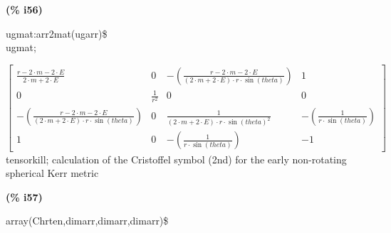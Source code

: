 \documentclass[fleqn]{article}
\begin{document}
\noindent
\begin{minipage}[t]{4.000000em}\color{red}\bfseries
(\% i56)	
\end{minipage}
\begin{minipage}[t]{\textwidth}\color{blue}
ugmat:arr2mat(ugarr)\$\\
ugmat;
\end{minipage}
\[\displaystyle \tag{\% o56} 
\begin{bmatrix}\frac{r\mathop{-}2\mathop{\ensuremath{\cdot}}m\mathop{-}2\mathop{\ensuremath{\cdot}}E}{2\mathop{\ensuremath{\cdot}}m\mathop{+}2\mathop{\ensuremath{\cdot}}E} & 0 & \mathop{-}\left( \frac{r\mathop{-}2\mathop{\ensuremath{\cdot}}m\mathop{-}2\mathop{\ensuremath{\cdot}}E}{\left( 2\mathop{\ensuremath{\cdot}}m\mathop{+}2\mathop{\ensuremath{\cdot}}E\right) \mathop{\ensuremath{\cdot}}r\mathop{\ensuremath{\cdot}}\sin{(theta)}}\right)  & 1\\
0 & \frac{1}{{{r}^{2}}} & 0 & 0\\
\mathop{-}\left( \frac{r\mathop{-}2\mathop{\ensuremath{\cdot}}m\mathop{-}2\mathop{\ensuremath{\cdot}}E}{\left( 2\mathop{\ensuremath{\cdot}}m\mathop{+}2\mathop{\ensuremath{\cdot}}E\right) \mathop{\ensuremath{\cdot}}r\mathop{\ensuremath{\cdot}}\sin{(theta)}}\right)  & 0 & \frac{1}{\left( 2\mathop{\ensuremath{\cdot}}m\mathop{+}2\mathop{\ensuremath{\cdot}}E\right) \mathop{\ensuremath{\cdot}}r\mathop{\ensuremath{\cdot}}{{\sin{(theta)}}^{2}}} & \mathop{-}\left( \frac{1}{r\mathop{\ensuremath{\cdot}}\sin{(theta)}}\right) \\
1 & 0 & \mathop{-}\left( \frac{1}{r\mathop{\ensuremath{\cdot}}\sin{(theta)}}\right)  & \mathop{-}1\end{bmatrix}\mbox{}
\]
tensorkill;
calculation of the Cristoffel symbol (2nd) for the early non-rotating spherical Kerr metric


\noindent
\begin{minipage}[t]{4.000000em}\color{red}\bfseries
(\% i57)	
\end{minipage}
\begin{minipage}[t]{\textwidth}\color{blue}
array(Chrten,dimarr,dimarr,dimarr)\$
\end{minipage}

\noindent%
\end{document}
